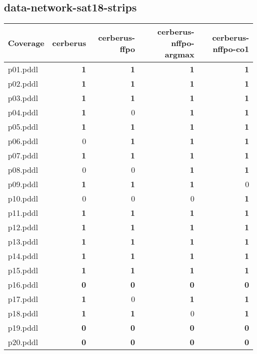 \documentclass{article}
\begin{document}
\hypertarget{coverage-data-network-sat18-strips}{}
\subsection*{data-network-sat18-strips}

\begin{tabular}{@{}lrrrr@{}}
Coverage & cerberus & cerberus-ffpo & cerberus-nffpo-argmax & cerberus-nffpo-co1 \\
\midrule
p01.pddl & \textbf{1} & \textbf{1} & \textbf{1} & \textbf{1} \\
p02.pddl & \textbf{1} & \textbf{1} & \textbf{1} & \textbf{1} \\
p03.pddl & \textbf{1} & \textbf{1} & \textbf{1} & \textbf{1} \\
p04.pddl & \textbf{1} & 0 & \textbf{1} & \textbf{1} \\
p05.pddl & \textbf{1} & \textbf{1} & \textbf{1} & \textbf{1} \\
p06.pddl & 0 & \textbf{1} & \textbf{1} & \textbf{1} \\
p07.pddl & \textbf{1} & \textbf{1} & \textbf{1} & \textbf{1} \\
p08.pddl & 0 & 0 & \textbf{1} & \textbf{1} \\
p09.pddl & \textbf{1} & \textbf{1} & \textbf{1} & 0 \\
p10.pddl & 0 & 0 & 0 & \textbf{1} \\
p11.pddl & \textbf{1} & \textbf{1} & \textbf{1} & \textbf{1} \\
p12.pddl & \textbf{1} & \textbf{1} & \textbf{1} & \textbf{1} \\
p13.pddl & \textbf{1} & \textbf{1} & \textbf{1} & \textbf{1} \\
p14.pddl & \textbf{1} & \textbf{1} & \textbf{1} & \textbf{1} \\
p15.pddl & \textbf{1} & \textbf{1} & \textbf{1} & \textbf{1} \\
p16.pddl & \textbf{0} & \textbf{0} & \textbf{0} & \textbf{0} \\
p17.pddl & \textbf{1} & 0 & \textbf{1} & \textbf{1} \\
p18.pddl & \textbf{1} & \textbf{1} & 0 & \textbf{1} \\
p19.pddl & \textbf{0} & \textbf{0} & \textbf{0} & \textbf{0} \\
p20.pddl & \textbf{0} & \textbf{0} & \textbf{0} & \textbf{0} \\
\end{tabular}

\hypertarget{coverage-depot}{}
\end{document}
